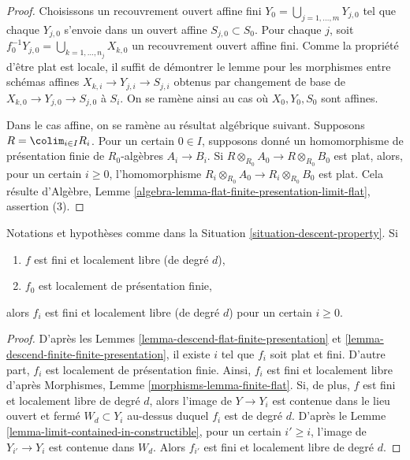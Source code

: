 \begin{proof}
Choisissons un recouvrement ouvert affine fini
$Y_0 = \bigcup_{j = 1, \ldots, m} Y_{j, 0}$ tel que chaque $Y_{j, 0}$
s'envoie dans un ouvert affine $S_{j, 0} \subset S_0$. Pour chaque $j$, soit
$f_0^{-1}Y_{j, 0} = \bigcup_{k = 1, \ldots, n_j} X_{k, 0}$ un recouvrement
ouvert affine fini. Comme la propriété d'être plat est locale, il suffit de
démontrer le lemme pour les morphismes entre schémas affines
$X_{k, i} \to Y_{j, i} \to S_{j, i}$ obtenus par changement de base
de $X_{k, 0} \to Y_{j, 0} \to S_{j, 0}$ à $S_i$. On se ramène ainsi au cas où
$X_0, Y_0, S_0$ sont affines.

\medskip\noindent
Dans le cas affine, on se ramène au résultat algébrique suivant. Supposons
$R = \colim_{i \in I} R_i$. Pour un certain $0 \in I$, supposons donné un
homomorphisme de présentation finie de $R_0$-algèbres $A_i \to B_i$. Si
$R \otimes_{R_0} A_0 \to R \otimes_{R_0} B_0$ est plat, alors, pour un
certain $i \geq 0$, l'homomorphisme
$R_i \otimes_{R_0} A_0 \to R_i \otimes_{R_0} B_0$ est plat. Cela résulte
d'Algèbre, Lemme \ref{algebra-lemma-flat-finite-presentation-limit-flat},
assertion (3).
\end{proof}

\begin{lemma}
\label{lemma-descend-finite-locally-free}
Notations et hypothèses comme dans la
Situation \ref{situation-descent-property}. Si
\begin{enumerate}
\item $f$ est fini et localement libre (de degré $d$),
\item $f_0$ est localement de présentation finie,
\end{enumerate}
alors $f_i$ est fini et localement libre (de degré $d$) pour un certain
$i \geq 0$.
\end{lemma}

\begin{proof}
D'après les Lemmes \ref{lemma-descend-flat-finite-presentation} et
\ref{lemma-descend-finite-finite-presentation}, il existe $i$ tel que $f_i$
soit plat et fini. D'autre part, $f_i$ est localement de présentation finie.
Ainsi, $f_i$ est fini et localement libre d'après Morphismes,
Lemme \ref{morphisms-lemma-finite-flat}. Si, de plus, $f$ est fini et
localement libre de degré $d$, alors l'image de $Y \to Y_i$ est contenue dans
le lieu ouvert et fermé $W_d \subset Y_i$ au-dessus duquel $f_i$ est de
degré $d$. D'après le Lemme \ref{lemma-limit-contained-in-constructible},
pour un certain $i' \geq i$, l'image de $Y_{i'} \to Y_i$ est contenue dans $W_d$.
Alors $f_{i'}$ est fini et localement libre de degré $d$.
\end{proof}

